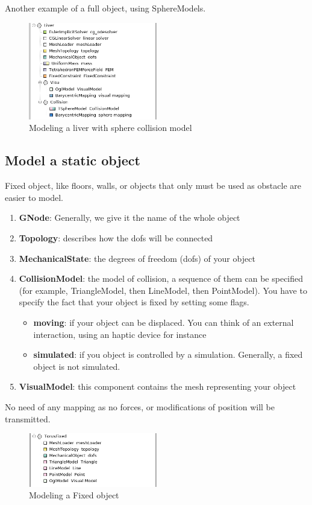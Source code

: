 Another example of a full object, using SphereModels.
\begin{figure}[htpb]
	\centering
		\includegraphics[width=0.5\textwidth]{Modelling3.jpg}
	\caption{Modeling a liver with sphere collision model}
\end{figure}

\subsection{Model a static object}
Fixed object, like floors, walls, or objects that only must be used as obstacle are easier to model. 

\begin{enumerate}
 \item { \bf GNode}: Generally, we give it the name of the whole object
 \item { \bf Topology}: describes how the dofs will be connected
 \item { \bf MechanicalState}: the degrees of freedom (dofs) of your object
 \item { \bf CollisionModel}: the model of collision, a sequence of them can be specified (for example, TriangleModel, then LineModel, then PointModel). You have to specify the fact that your object is fixed by setting some flags.
\begin{itemize}
 \item { \bf moving}: if your object can be displaced. You can think of an external interaction, using an haptic device for instance
 \item { \bf simulated}: if you object is controlled by a simulation. Generally, a fixed object is not simulated.
\end{itemize}
 \item { \bf VisualModel}: this component contains the mesh representing your object
\end{enumerate}
No need of any mapping as no forces, or modifications of position will be transmitted.

\begin{figure}[htpb]
	\centering
		\includegraphics[width=0.5\textwidth]{Modelling4.jpg}
	\caption{Modeling a Fixed object}
\end{figure}


